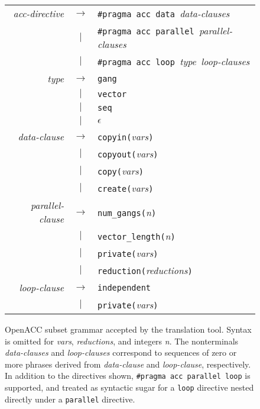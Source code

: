 \documentclass{sig-alternate-05-2015}
\begin{document}
\begin{figure}
\begin{tabular}{rcl}
\textit{acc-directive} &$\rightarrow$& \texttt{\#pragma acc data\ }\textit{data-clauses} \\
                       &     $|$     & \texttt{\#pragma acc parallel}\texttt{\ }\textit{parallel-clauses} \\
                       &     $|$     & \texttt{\#pragma acc loop\ }\textit{type}\texttt{\ }\textit{loop-clauses} \\
\textit{type}          &$\rightarrow$& \texttt{gang} \\
                       &     $|$     & \texttt{vector} \\
                       &     $|$     & \texttt{seq} \\
                       &     $|$     & $\epsilon$ \\
\textit{data-clause}   &$\rightarrow$& \texttt{copyin(}\textit{vars}\texttt{)} \\
                       &     $|$     & \texttt{copyout(}\textit{vars}\texttt{)} \\
                       &     $|$     & \texttt{copy(}\textit{vars}\texttt{)} \\
                       &     $|$     & \texttt{create(}\textit{vars}\texttt{)} \\
\textit{parallel-clause}&$\rightarrow$&\texttt{num\_gangs(}\textit{n}\texttt{)} \\
                       &     $|$     & \texttt{vector\_length(}\textit{n}\texttt{)} \\
                       &     $|$     & \texttt{private(}\textit{vars}\texttt{)} \\
                       &     $|$     & \texttt{reduction(}\textit{reductions}\texttt{)} \\
\textit{loop-clause}   &$\rightarrow$& \texttt{independent} \\
                       &     $|$     & \texttt{private(}\textit{vars}\texttt{)} \\
\end{tabular}
\caption{OpenACC subset grammar accepted by the translation tool.  Syntax is
omitted for \textit{vars}, \textit{reductions}, and integers \textit{n}.  The
nonterminals \textit{data-clauses} and \textit{loop-clauses} correspond to
sequences of zero or more phrases derived from \textit{data-clause} and
\textit{loop-clause}, respectively.  In addition to the directives shown,
\texttt{\#pragma acc parallel loop} is supported, and treated as syntactic
sugar for a \texttt{loop} directive nested directly under a \texttt{parallel}
directive.}
\label{fig:grammar}
\end{figure}
\end{document}
